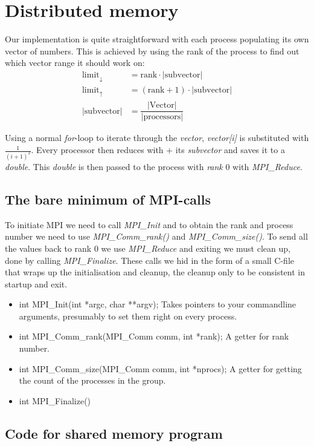 \section{Distributed memory}
Our implementation is quite straightforward with each process populating its own vector of numbers. This is achieved by using the rank of the process to find out which vector range it should work on: 
\begin{align}
\mathrm{limit}_{↓} &= \mathrm{rank}\cdot |\mathrm{subvector}|\\
\mathrm{limit}_{↑} &= (\mathrm{rank} +1 )\cdot |\mathrm{subvector}|\\
|\mathrm{subvector}| &= \dfrac{|\mathrm{Vector}|}{|\mathrm{processors}|}
\end{align}

Using a normal \emph{for}-loop to iterate through the \emph{vector}, \emph{vector[i]} is substituted 
with $\frac{1}{(i+1)^2}$. Every processor then reduces with + its \emph{subvector} and saves it to a 
\emph{double}. This \emph{double} is then passed to the process with \emph{rank} 0 with 
\emph{MPI\_Reduce}. 

\subsection*{The bare minimum of MPI-calls}
To initiate MPI we need to call \emph{MPI\_Init} and to obtain the rank and process number we need to 
use \emph{MPI\_Comm\_rank()} and \emph{MPI\_Comm\_size()}. To send all the values back to rank 0 we 
use \emph{MPI\_Reduce} and exiting we must clean up, done by calling \emph{MPI\_Finalize}. These calls we hid in the form of a small C-file that wraps up the initialisation and cleanup, the cleanup only to be consistent in startup and exit. 
\begin{itemize}
\item int MPI\_Init(int *argc, char **argv);
Takes pointers to your commandline arguments, presumably to set them right on every process.
\item int MPI\_Comm\_rank(MPI\_Comm comm, int *rank);
A getter for rank number. 
\item int MPI\_Comm\_size(MPI\_Comm comm, int *nprocs);
A getter for getting the count of the processes in the group. 
\item int MPI\_Finalize()
\end{itemize}
\subsection{Code for shared memory program}
\inputminted[tabsize=4]{c}{../VectorSum.c}


